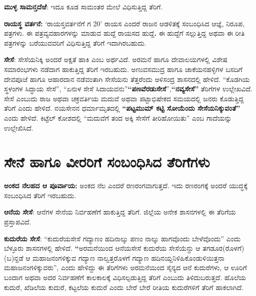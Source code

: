 \textbf{ಮುಳ್ಳ ಸಾಮನ್ತದೆಱೆ}: ಇದೂ ಕೂಡ ಸಾಮಂತರ ಮೇಲೆ ವಿಧಿಸುತ್ತಿದ್ದ ತೆರಿಗೆ.

\textbf{ರಾಯಸ್ಥ ವರ್ತನೆ:} ‘ರಾಯಸ್ತವರ್ತನೆಗೆ ಗ 20’ ರಾಯಸ ಎಂದರೆ ರಾಜನ ಆಡಳಿತಕ್ಕೆ ಸಂಬಂಧಿಸಿದ ಆಜ್ಞೆ, ನಿರೂಪ, ಪತ್ರಗಳು. ಈ ಪತ್ರವ್ಯವಹಾರಗಳನ್ನು ಮಾಡುವ ಹುದ್ದೆ ರಾಯಸದ ಹುದ್ದೆ\textbf{. } ಈ ಹುದ್ದೆಗೆ ಸಲ್ಲುತ್ತಿದ್ದ ಅಥವಾ ಈ ರೀತಿ ಪತ್ರಗಳನ್ನು ಬರೆಯುವವರಿಗೆ ವಿಧಿಸುತ್ತಿದ್ದ ತೆರಿಗೆ ಇದಾಗಿರಬಹುದು.

\textbf{ಸೇಸೆ}: ಸೇಸೆಯನಿಕ್ಕಿ ಅಂದರೆ ಅಕ್ಷತೆ ಹಾಕಿ ಎಂಬ ಅರ್ಥವಿದೆ. ಅರಮನೆ ಹಾಗೂ ದೇವಾಲಯಗಳಲ್ಲಿ ವಿಶೇಷ ಸಮಾರಂಭಗಳು ನಡೆದಾಗ ಹಾಕುತ್ತಿದ್ದ ತೆರಿಗೆ ಇರಬಹುದು. ಅಣುವಸಮುದ್ರ ಹಾಗೂ ಚಾಕೆಯನಹಳ್ಳಿಗಳ ಬಸದಿಗೆ ದೇವಪೂಜೆ ಹಾಗೂ ಆಹಾರದಾನ ನಡೆವಂತಾಗಿ ಸೇಸೆಯನು ತೆತ್ತರೆಂದು ಅಳಿಸಂದ್ರ ಶಾಸನದಲ್ಲಿ ಹೇಳಿದೆ. “ಕೊಡಗಿಯ ಸ್ಥಳಂಗಳ ಸಿದ್ಧಾಯ ಸೇಸೆ”, “ಏನುಳ ಸೇಸೆ ಸಿದಾಯವನು”\textbf{“ಪಣವೆರಡುಸೇಸೆ}”,\textbf{“ನವ್ಯಸೇಸೆ”} ತೆರಿಗೆಗಳ ಉಲ್ಲೇಖವಿದೆ. ಸೇಸೆ ಎಂಬುದು ರಾಜ ಅಥವಾ ಚಕ್ರವರ್ತಿಯ ಮದುವೆ ಅಥವಾ ಪಟ್ಟಾಭಿಷೇಕದ ಸಮಯದಲ್ಲಿ ಜನರು ಕೊಡುತ್ತಿದ್ದ ತೆರಿಗೆ ಎಂದು ಹೇಳಿದೆ. ನಯಸೇನನ ಧರ್ಮಾಮೃತದಲ್ಲಿ \textbf{“ಪಟ್ಟಮುಮ್ ಕಟ್ಟಿ ಸೋಯೆಂದು ಸೇಸೆಯನಿಕ್ಕುವಂತೆ”} ಎಂದು ಹೇಳಿದೆ. ಕಿಟ್ಟೆಲ್​ ಕೋಶದಲ್ಲಿ “ಮದುವೆಗೆ ತಂದ ಅಕ್ಕಿ ಸೇಸೆಗೆ ತೀರಿಹೋಯಿತು” ಎಂಬ ಗಾದೆಯನ್ನು ಉಲ್ಲೇಖಿಸಿದೆ.

\section{ಸೇನೆ ಹಾಗೂ ವೀರರಿಗೆ ಸಂಬಂಧಿಸಿದ ತೆರಿಗೆಗಳು}

\textbf{ಅಂಕದ ನೆಲಹದ ಆ ಪೂರ್ವಾಯ:} ಅಂಕದ ನೆಲ ಎಂದರೆ ರಣರಂಗವಾಗುತ್ತದೆ. ಇದು ರಣರಂಗಕ್ಕೆ ಅಂದರೆ ಯುದ್ಧಕ್ಕೆ ಸಂಬಂಧಿಸಿದ ತೆರಿಗೆ ಇರಬಹುದು.

\textbf{ಆನೆಯ ಸೇಸೆ}: ಆನೆಗಳ ಸೇನೆಯ ನಿರ್ವಹಣೆಗೆ ಹಾಕುತ್ತಿದ್ದ ತೆರಿಗೆ. ಜಿಲ್ಲೆಯ ಅನೇಕ ಶಾಸನಗಳಲ್ಲಿ ಈ ತೆರಿಗೆಯ ಪ್ರಸ್ತಾಪವಿದೆ.

\textbf{ಕುದುರೆಯ ಸೇಸೆ}: “ಕುದುರೆಯಸೇಸೆ ಗದ್ಯಾಣಂ ಹದಿನಾಲ್ಕು ಪಣಂ ನಾಲ್ಕು ಹಾಗವೊಂದು ಬೇಳೆವೊಂದು” ಎಂದು ಬೆಳ್ಳೂರು ಶಾಸನಗಳಲ್ಲಿ ಹೇಳಿದೆ. \textbf{“}ಅರಮನೆಯಿಂದ ಆನೆಯಸೇಸೆ ಕುದುರೆಯ ಸೇಸೆಯೆನ್ದು ಆ ತಗಡೂರ(ರೊಳಗೆ) (ಬ)ನ್ದಡೆ ಆ ಮಹಾಜನಂಗಳಿಕ್ಕುವ ಗದ್ಯಾಣ ನಾಲ್ವತ್ತರೊಳಗೆ ಗದ್ಯಾಣ ಹದಿನಯ್ದನಿಳಿಹಿಕೊಂಡುಳಿಯಿತ್ತನಾ ಮಹಾಜನಂಗಳಿಕ್ಕು\-ವರು”, ಎಂದು ಹೇಳಿದ್ದು ಈ ತೆರಿಗೆಗಳು ಅರಮನೆಯಿಂದ ಸೈನ್ಯದ ಆನೆ ಕುದುರೆಗಳು, ಆ ಊರಿಗೆ ಬಂದಾಗ ಅಥವಾ ಅದರ ನಿರ್ವಹಣೆಗೆ ಕಾಲಕಾಲಕ್ಕೆ ವಿಧಿಸಲ್ಪಡುತ್ತಿದ್ದ ತೆರಿಗೆ ಎಂಬುದು ತಿಳಿದುಬರುತ್ತದೆ. ಹೊಲೆಯ ಕುದುರೆ, ಖೆಡಿಲೆಯ ಕುದುರೆ, ಕಟ್ಟಲೆಯ ಕುದುರೆ ಎಂದು ಬೇರೆ ಬೇರೆ ರೀತಿಯ ಕುದುರೆಗಳಿಗೆ ತೆರಿಗೆ ಹಾಕಲಾಗಿದೆ.

